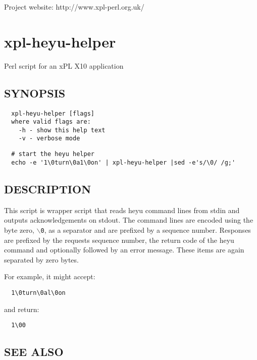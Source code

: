 \documentclass[12pt,a4paper]{article}
\begin{document}
Project website: http://www.xpl-perl.org.uk/

\newpage
\section{xpl-heyu-helper\label{xpl-heyu-helper}}


Perl script for an xPL X10 application

\subsection*{SYNOPSIS\label{xpl-heyu-helper_SYNOPSIS}}
\begin{verbatim}
  xpl-heyu-helper [flags]
  where valid flags are:
    -h - show this help text
    -v - verbose mode
\end{verbatim}
\begin{verbatim}
  # start the heyu helper
  echo -e '1\0turn\0a1\0on' | xpl-heyu-helper |sed -e's/\0/ /g;'
\end{verbatim}
\subsection*{DESCRIPTION\label{xpl-heyu-helper_DESCRIPTION}}


This script is wrapper script that reads heyu command lines from stdin
and outputs acknowledgements on stdout.  The command lines are encoded
using the byte zero, \texttt{$\backslash$0}, as a separator and are prefixed by a
sequence number.  Responses are prefixed by the requests sequence
number, the return code of the heyu command and optionally followed by
an error message.  These items are again separated by zero bytes.



For example, it might accept:

\begin{verbatim}
  1\0turn\0al\0on
\end{verbatim}


and return:

\begin{verbatim}
  1\00
\end{verbatim}
\subsection*{SEE ALSO\label{xpl-heyu-helper_SEE_ALSO}}
\end{document}
